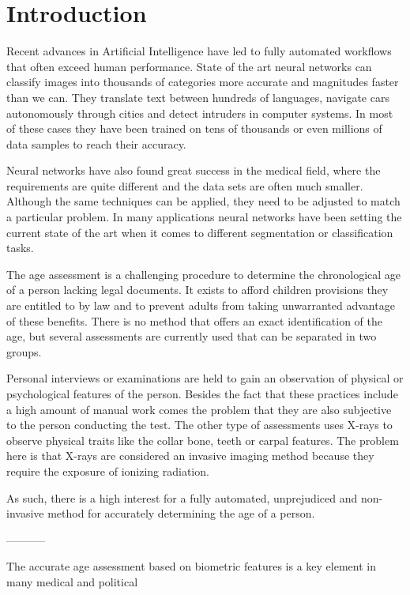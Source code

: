 \section{Introduction}

Recent advances in Artificial Intelligence have led to fully automated workflows that often exceed human performance. State of the art neural networks can classify images into thousands of categories more accurate and magnitudes faster than we can. They translate text between hundreds of languages, navigate cars autonomously through cities and detect intruders in computer systems. In most of these cases they have been trained on tens of thousands or even millions of data samples to reach their accuracy. 

Neural networks have also found great success in the medical field, where the requirements are quite different and the data sets are often much smaller. Although the same techniques can be applied, they need to be adjusted to match a particular problem. In many applications neural networks have been setting the current state of the art when it comes to different segmentation or classification tasks.

The age assessment is a challenging procedure to determine the chronological age of a person lacking legal documents. It exists to afford children provisions they are entitled to by law and to prevent adults from taking unwarranted advantage of these benefits. There is no method that offers an exact identification of the age, but several assessments are currently used that can be separated in two groups.

Personal interviews or examinations are held to gain an observation of physical or psychological features of the person. Besides the fact that these practices include a high amount of manual work comes the problem that they are also subjective to the person conducting the test. The other type of assessments uses X-rays to observe physical traits like the collar bone, teeth or carpal features. The problem here is that X-rays are considered an invasive imaging method because they require the exposure of ionizing radiation.

As such, there is a high interest for a fully automated, unprejudiced and non-invasive method for accurately determining the age of a person.


-----------

The accurate age assessment based on biometric features is a key element in many medical and political

